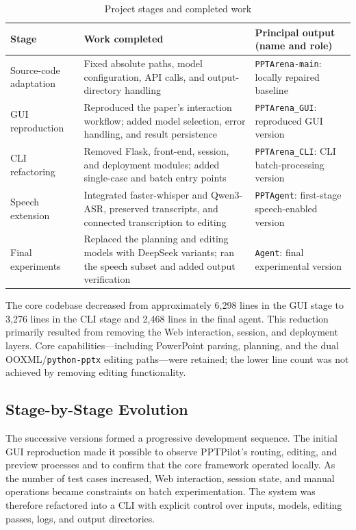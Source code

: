 \documentclass[11pt,a4paper,UTF8,fontset=fandol]{ctexart}
\begin{document}
\begin{table}[H]
\centering
\caption{Project stages and completed work}
\small
\begin{tabularx}{\textwidth}{L{2.5cm} Y Y}
\toprule
Stage & Work completed & Principal output (name and role) \\
\midrule
Source-code adaptation & Fixed absolute paths, model configuration, API calls, and output-directory handling & \texttt{PPTArena-main}: locally repaired baseline \\
GUI reproduction & Reproduced the paper's interaction workflow; added model selection, error handling, and result persistence & \texttt{PPTArena\_GUI}: reproduced GUI version \\
CLI refactoring & Removed Flask, front-end, session, and deployment modules; added single-case and batch entry points & \texttt{PPTArena\_CLI}: CLI batch-processing version \\
Speech extension & Integrated faster-whisper and Qwen3-ASR, preserved transcripts, and connected transcription to editing & \texttt{PPTAgent}: first-stage speech-enabled version \\
Final experiments & Replaced the planning and editing models with DeepSeek variants; ran the speech subset and added output verification & \texttt{Agent}: final experimental version \\
\bottomrule
\end{tabularx}
\end{table}

The core codebase decreased from approximately 6,298 lines in the GUI stage to 3,276 lines in the CLI stage and 2,468 lines in the final agent. This reduction primarily resulted from removing the Web interaction, session, and deployment layers. Core capabilities---including PowerPoint parsing, planning, and the dual OOXML/\texttt{python-pptx} editing paths---were retained; the lower line count was not achieved by removing editing functionality.

\subsection{Stage-by-Stage Evolution}

The successive versions formed a progressive development sequence. The initial GUI reproduction made it possible to observe PPTPilot's routing, editing, and preview processes and to confirm that the core framework operated locally. As the number of test cases increased, Web interaction, session state, and manual operations became constraints on batch experimentation. The system was therefore refactored into a CLI with explicit control over inputs, models, editing passes, logs, and output directories.
\end{document}
